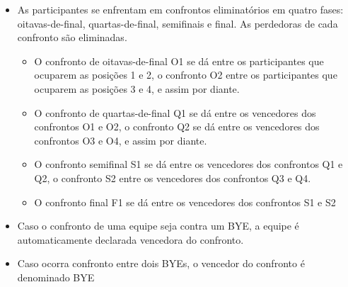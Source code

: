 \begin{itemize}[noitemsep]
	\item As participantes se enfrentam em confrontos eliminatórios em quatro fases: oitavas-de-final, quartas-de-final, semifinais e final. As perdedoras de cada confronto são eliminadas.
	\begin{itemize}[noitemsep]
		\item O confronto de oitavas-de-final O1 se dá entre os participantes que ocuparem as posições 1 e 2, o confronto O2 entre os participantes que ocuparem as posições 3 e 4, e assim por diante.
		\item O confronto de quartas-de-final Q1 se dá entre os vencedores dos confrontos O1 e O2, o confronto Q2 se dá entre os vencedores dos confrontos O3 e O4, e assim por diante.
		\item O confronto semifinal S1 se dá entre os vencedores dos confrontos Q1 e Q2, o confronto S2 entre os vencedores dos confrontos Q3 e Q4.
		\item O confronto final F1 se dá entre os vencedores dos confrontos S1 e S2
	\end{itemize}

	\item Caso o confronto de uma equipe seja contra um BYE, a equipe é automaticamente declarada vencedora do confronto.
	\item Caso ocorra confronto entre dois BYEs, o vencedor do confronto é denominado BYE
\end{itemize}

